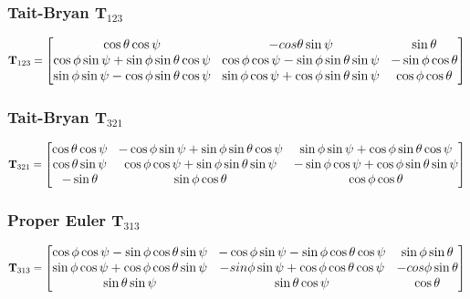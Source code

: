 {\color{red}\subsubsection{Tait-Bryan $\mathbf{T}_{123}$}}
\begin{equation*}
    {\large{
        \mathbf{T}_{123}=\begin{bmatrix}
            \cos\theta \cos \psi &
            -cos\theta \sin \psi &
            \sin\theta \\
            \cos\phi\sin\psi + \sin\phi\sin\theta\cos\psi&
            \cos\phi\cos\psi - \sin\phi\sin\theta\sin\psi&
            -\sin\phi\cos\theta\\
            \sin\phi\sin\psi-\cos\phi\sin\theta\cos\psi &
            \sin\phi\cos\psi+\cos\phi\sin\theta\sin\psi &
            \cos\phi\cos\theta
        \end{bmatrix}
    }}
\end{equation*}

{\color{red}\subsubsection{Tait-Bryan $\mathbf{T}_{321}$}}
\begin{equation*}
    {\large{
        \mathbf{T}_{321} = \begin{bmatrix}
            \cos\theta \cos\psi & -\cos\phi \sin\psi +\sin\phi\sin\theta\cos\psi & \sin\phi\sin\psi +\cos\phi \sin\theta \cos\psi\\
            \cos\theta \sin\psi & \cos\phi \cos\psi +\sin\phi\sin\theta\sin\psi & -\sin\phi\cos\psi +\cos\phi \sin\theta \sin\psi\\
            -\sin\theta & \sin\phi\cos\theta&\cos\phi\cos\theta
        \end{bmatrix}
    }}
\end{equation*}


{\color{red}\subsubsection{Proper Euler $\mathbf{T}_{313}$}}
\begin{equation*}
    {\large{
        \mathbf{T}_{313} = \begin{bmatrix}
            \cos\phi \cos\psi - \sin\phi \cos\theta \sin\psi & -\cos\phi \sin\psi -\sin\phi \cos\theta \cos\psi & \sin\phi \sin\theta\\
            \sin\phi \cos\psi + \cos\phi \cos\theta \sin\psi & -sin\phi \sin\psi + \cos\phi \cos\theta \cos\psi & -cos\phi \sin\theta\\
            \sin\theta \sin\psi & \sin\theta \cos\psi & \cos\theta 
    \end{bmatrix}
    }} 
\end{equation*}

